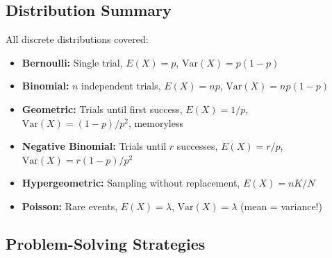 \subsection{Distribution Summary}

All discrete distributions covered:
\begin{itemize}
    \item \textbf{Bernoulli:} Single trial, \(E(X) = p\), \(\text{Var}(X) = p(1-p)\)
    \item \textbf{Binomial:} \(n\) independent trials, \(E(X) = np\), \(\text{Var}(X) = np(1-p)\)
    \item \textbf{Geometric:} Trials until first success, \(E(X) = 1/p\), \(\text{Var}(X) = (1-p)/p^2\), memoryless
    \item \textbf{Negative Binomial:} Trials until \(r\) successes, \(E(X) = r/p\), \(\text{Var}(X) = r(1-p)/p^2\)
    \item \textbf{Hypergeometric:} Sampling without replacement, \(E(X) = nK/N\)
    \item \textbf{Poisson:} Rare events, \(E(X) = \lambda\), \(\text{Var}(X) = \lambda\) (mean = variance!)
\end{itemize}

\subsection{Problem-Solving Strategies}


